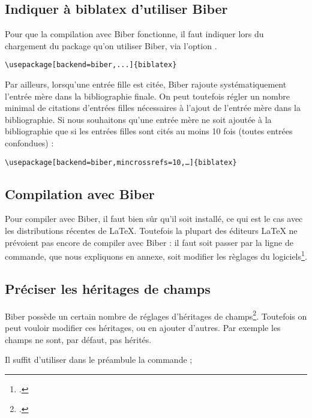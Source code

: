 \subsection{Indiquer à biblatex d'utiliser Biber}

Pour que la compilation avec Biber fonctionne, il faut indiquer lors du chargement du package qu'on utiliser Biber, via l'option .

\begin{verbatim}
\usepackage[backend=biber,...]{biblatex}
\end{verbatim}

Par ailleurs, lorsqu'une entrée fille est citée, Biber rajoute systématiquement l'entrée mère dans la bibliographie finale. On peut toutefois régler un nombre minimal de citations d'entrées filles nécessaires à l'ajout de l'entrée mère dans la bibliographie. Si nous souhaitons qu'une entrée mère ne soit ajoutée à la bibliographie que si les entrées filles sont cités au moins 10 fois (toutes entrées confondues) :


\begin{verbatim}
\usepackage[backend=biber,mincrossrefs=10,…]{biblatex}
\end{verbatim}

\subsection{Compilation avec Biber}

Pour compiler avec Biber, il faut bien sûr qu'il soit installé, ce qui est le cas avec les distributions récentes de \LaTeX. Toutefois la plupart des éditeurs \LaTeX{} ne prévoient pas encore de compiler avec Biber : il faut soit passer par la ligne de commande, que nous expliquons en annexe, soit modifier les règlages du logiciels\footcite[On peut trouver comment faire pour quelques logiciels à cette adresse]{biber_logiciels}.
\subsection{Préciser les héritages de champs}

Biber possède un certain nombre de réglages d'héritages de champs\footcite{biblatex_crossrefsetup}. Toutefois on peut vouloir modifier ces héritages, ou en ajouter d'autres. Par exemple les champs  ne sont, par défaut, pas hérités. 

Il suffit d'utiliser dans le préambule la commande ;

